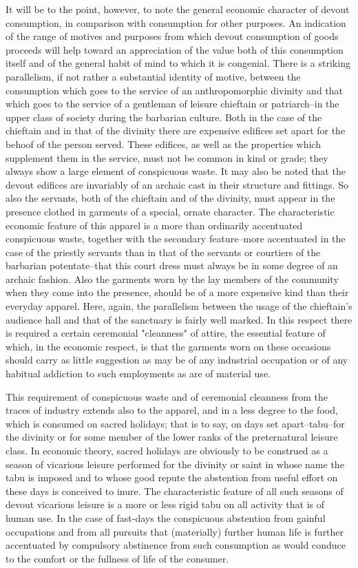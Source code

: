 \documentclass[12pt]{report}
\begin{document}
It will be to the point, however, to note the general economic character
of devout consumption, in comparison with consumption for other
purposes. An indication of the range of motives and purposes from which
devout consumption of goods proceeds will help toward an appreciation
of the value both of this consumption itself and of the general habit of
mind to which it is congenial. There is a striking parallelism, if not
rather a substantial identity of motive, between the consumption which
goes to the service of an anthropomorphic divinity and that which goes
to the service of a gentleman of leisure chieftain or patriarch--in the
upper class of society during the barbarian culture. Both in the case of
the chieftain and in that of the divinity there are expensive edifices
set apart for the behoof of the person served. These edifices, as well
as the properties which supplement them in the service, must not be
common in kind or grade; they always show a large element of conspicuous
waste. It may also be noted that the devout edifices are invariably of
an archaic cast in their structure and fittings. So also the servants,
both of the chieftain and of the divinity, must appear in the presence
clothed in garments of a special, ornate character. The characteristic
economic feature of this apparel is a more than ordinarily accentuated
conspicuous waste, together with the secondary feature--more accentuated
in the case of the priestly servants than in that of the servants or
courtiers of the barbarian potentate--that this court dress must always
be in some degree of an archaic fashion. Also the garments worn by the
lay members of the community when they come into the presence, should be
of a more expensive kind than their everyday apparel. Here, again, the
parallelism between the usage of the chieftain's audience hall and
that of the sanctuary is fairly well marked. In this respect there
is required a certain ceremonial "cleanness" of attire, the essential
feature of which, in the economic respect, is that the garments worn
on these occasions should carry as little suggestion as may be of any
industrial occupation or of any habitual addiction to such employments
as are of material use.

This requirement of conspicuous waste and of ceremonial cleanness from
the traces of industry extends also to the apparel, and in a less degree
to the food, which is consumed on sacred holidays; that is to say, on
days set apart--tabu--for the divinity or for some member of the lower
ranks of the preternatural leisure class. In economic theory, sacred
holidays are obviously to be construed as a season of vicarious leisure
performed for the divinity or saint in whose name the tabu is imposed
and to whose good repute the abstention from useful effort on these days
is conceived to inure. The characteristic feature of all such seasons
of devout vicarious leisure is a more or less rigid tabu on all
activity that is of human use. In the case of fast-days the conspicuous
abstention from gainful occupations and from all pursuits that
(materially) further human life is further accentuated by compulsory
abstinence from such consumption as would conduce to the comfort or the
fullness of life of the consumer.
\end{document}

